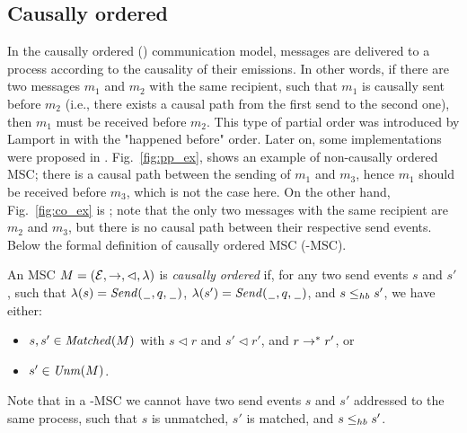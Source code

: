 \subsection{ Causally ordered}
In the causally ordered (\co) communication model, messages are delivered to a process according to the causality of their emissions. In other words, if there are two messages $m_1$ and $m_2$ with the same recipient, such that $m_1$ is causally sent before $m_2$ (i.e., there exists a causal path from the first send to the second one), then $m_1$ must be received before $m_2$.
This type of partial order was introduced by Lamport in \cite{Lamport78} with the "happened before" order. Later on, some implementations were proposed in \cite{peterson1989preserving, DBLP:conf/wdag/SchiperES89, kshemkalyani1998necessary}. %
Fig.~\ref{fig:pp_ex}, shows an example of non-causally ordered MSC; there is a causal path between the sending of $m_1$ and $m_3$, hence $m_1$ should be received before $m_3$, which is not the case here. On the other hand, Fig.~\ref{fig:co_ex} is \co; note that the only two messages with the same recipient are $m_2$ and $m_3$, but there is no causal path between their respective send events. Below the formal definition of causally ordered MSC (\co-MSC).

\begin{definition}[\co-MSC]\label{def:co_msc}
	An MSC $M = (\mathcal{E},\to,\lhd,\lambda)$ is \emph{causally ordered} if, for any two send events $s$ and $s'$, such that $\lambda(s)={\mathit{Send}(\hspace{0.1em}\underline{\hspace{0.5em}}\hspace{0.1em},q,\hspace{0.1em}\underline{\hspace{0.5em}}\hspace{0.1em})}$, $\lambda(s')={\mathit{Send}(\hspace{0.1em}\underline{\hspace{0.5em}}\hspace{0.1em},q,\hspace{0.1em}\underline{\hspace{0.5em}}\hspace{0.1em})}$, and $s \leq_{hb} s'$, we have either:
	\begin{itemize}%
		\item $s,s' \in \mathit{Matched}(M)$ with  $s \lhd r$ and $s' \lhd r'$, and $r \to^* r'$, or %
		\item $s' \in \mathit{Unm}(M)$.
	\end{itemize}
\end{definition}

Note that in a \co-MSC we cannot have two send events $s$ and $s'$ addressed to the same process, such that $s$ is unmatched, $s'$ is matched, and $s \leq_{hb} s'$. 

